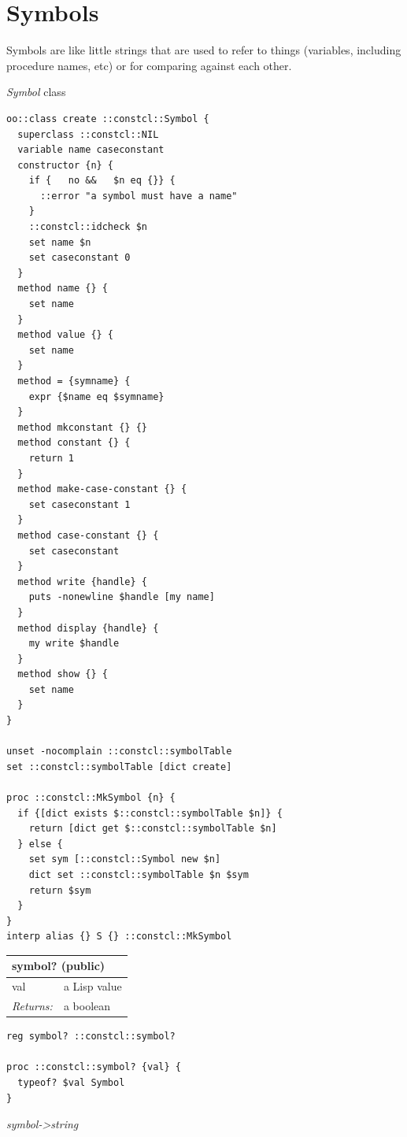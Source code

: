 \documentclass[twoside,9pt]{report}
\begin{document}
\section{Symbols}
\label{symbols}

Symbols are like little strings that are used to refer to things (variables, including procedure names, etc) or for comparing against each other.


\emph{Symbol} class

\noindent\makebox[\linewidth]{\rule{\linewidth}{0.4pt}}
\begin{lstlisting}
oo::class create ::constcl::Symbol {
  superclass ::constcl::NIL
  variable name caseconstant
  constructor {n} {
    if {   no &&   $n eq {}} {
      ::error "a symbol must have a name"
    }
    ::constcl::idcheck $n
    set name $n
    set caseconstant 0
  }
  method name {} {
    set name
  }
  method value {} {
    set name
  }
  method = {symname} {
    expr {$name eq $symname}
  }
  method mkconstant {} {}
  method constant {} {
    return 1
  }
  method make-case-constant {} {
    set caseconstant 1
  }
  method case-constant {} {
    set caseconstant
  }
  method write {handle} {
    puts -nonewline $handle [my name]
  }
  method display {handle} {
    my write $handle
  }
  method show {} {
    set name
  }
}
 
unset -nocomplain ::constcl::symbolTable
set ::constcl::symbolTable [dict create]
 
proc ::constcl::MkSymbol {n} {
  if {[dict exists $::constcl::symbolTable $n]} {
    return [dict get $::constcl::symbolTable $n]
  } else {
    set sym [::constcl::Symbol new $n]
    dict set ::constcl::symbolTable $n $sym
    return $sym
  }
}
interp alias {} S {} ::constcl::MkSymbol
\end{lstlisting}
\noindent\makebox[\linewidth]{\rule{\linewidth}{0.4pt}}
\begin{tabular}{ |l l| }
\hline
\multicolumn{2}{|l|}{symbol? (public)} \\
\hline
val & a Lisp value \\
\textit{Returns:} & a boolean \\
\hline
\end{tabular}

\noindent\makebox[\linewidth]{\rule{\linewidth}{0.4pt}}
\begin{lstlisting}
reg symbol? ::constcl::symbol?
 
proc ::constcl::symbol? {val} {
  typeof? $val Symbol
}
\end{lstlisting}
\noindent\makebox[\linewidth]{\rule{\linewidth}{0.4pt}}

\emph{symbol->string}
\end{document}
